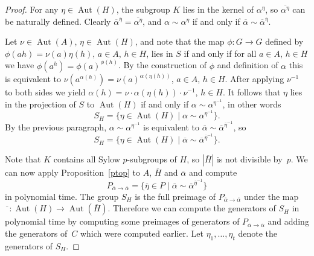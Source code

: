 \documentclass[10pt,a4paper]{amsart}
\DeclareMathOperator{\Aut}{Aut}
\begin{document}
\begin{proof}
	For any \( \eta \in \Aut(H) \), the subgroup \( K \) lies in the kernel of \( \alpha^\eta \),
	so \( \overline{\alpha^\eta} \) can be naturally defined. Clearly \( \overline{\alpha}^{\overline{\eta}} = \overline{\alpha^\eta} \),
	and \( \alpha \sim \alpha^\eta \) if and only if \( \overline{\alpha} \sim \overline{\alpha}^{\overline{\eta}} \).

	Let \( \nu \in \Aut(A) \), \( \eta \in \Aut(H) \), and note that the map \( \phi : G \to G \) defined by
	\( \phi(ah) = \nu(a)\eta(h) \), \( a \in A \), \( h \in H \), lies in \( S \) if and only if
	for all \( a \in A \), \( h \in H \) we have \( \phi(a^h) = \phi(a)^{\phi(h)} \).
	By the construction of \( \phi \) and definition of \( \alpha \) this is equivalent to
	\( \nu(a^{\alpha(h)}) = \nu(a)^{\alpha(\eta(h))} \), \( a \in A \), \( h \in H \).
	After applying \( \nu^{-1} \) to both sides we yield \( \alpha(h) = \nu \cdot \alpha(\eta(h)) \cdot \nu^{-1} \), \( h \in H \).
	It follows that \( \eta \) lies in the projection of \( S \) to \( \Aut(H) \) if and only if \( \alpha \sim \alpha^{\eta^{-1}} \), in other words
	\[ S_H = \{ \eta \in \Aut(H) \mid \alpha \sim \alpha^{\eta^{-1}} \}. \]
	By the previous paragraph, \( \alpha \sim \alpha^{\eta^{-1}} \) is equivalent to \( \overline{\alpha} \sim \overline{\alpha}^{\overline{\eta}^{-1}} \), so
	\[ S_H = \{ \eta \in \Aut(H) \mid \overline{\alpha} \sim \overline{\alpha}^{\overline{\eta}^{-1}} \}. \]

	Note that \( K \) contains all Sylow \( p \)-subgroups of \( H \), so \( |\overline{H}| \) is not divisible by~\( p \).
	We can now apply Proposition~\ref{ptop} to \( A \), \( \overline{H} \) and \( \overline{\alpha} \)
	and compute
	\[ P_{\overline{\alpha} \to \overline{\alpha}} = \{ \overline{\eta} \in P \mid
	\overline{\alpha} \sim \overline{\alpha}^{\overline{\eta}^{-1}} \} \]
	in polynomial time.
	The group \( S_H \) is the full preimage of \( P_{\overline{\alpha} \to \overline{\alpha}} \)
	under the map \( \overline{\phantom{a}} : \Aut(H) \to \Aut(\overline{H}) \). Therefore we can compute the generators of \( S_H \)
	in polynomial time by computing some preimages of generators of \( P_{\overline{\alpha} \to \overline{\alpha}} \) and adding the generators of~\( C \)
	which were computed earlier. Let \( \eta_1, \dots, \eta_t \) denote the generators of \( S_H \).


\end{proof}
\end{document}
